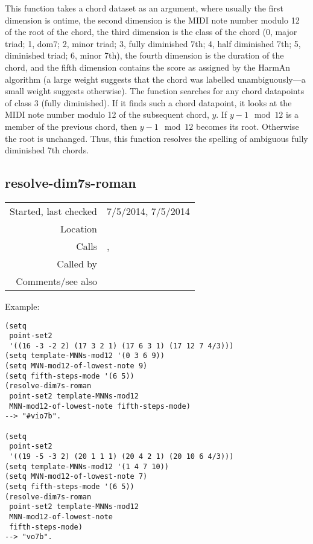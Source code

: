 \noindent This function takes a chord dataset as an
argument, where usually the first dimension is ontime,
the second dimension is the MIDI note number modulo 12
of the root of the chord, the third dimension is the
class of the chord (0, major triad; 1, dom7; 2, minor
triad; 3, fully diminished 7th; 4, half diminished
7th; 5, diminished triad; 6, minor 7th), the fourth
dimension is the duration of the chord, and the
fifth dimension contains the score as assigned by the
HarmAn algorithm (a large weight suggests that the
chord was labelled unambiguously---a small weight
suggests otherwise). The function searches for any
chord datapoints of class 3 (fully diminished). If it
finds such a chord datapoint, it looks at the MIDI
note number modulo 12 of the subsequent chord, $y$. If
$y - 1 \mod 12$ is a member of the previous chord,
then $y - 1 \mod 12$ becomes its root. Otherwise the
root is unchanged. Thus, this function resolves the
spelling of ambiguous fully diminished 7th chords.


\subsection*{resolve-dim7s-roman}\label{fun:resolve-dim7s-roman}

\vspace{0.3cm}
\begin{tabular}{r|p{8cm}}
Started, last checked & 7/5/2014, 7/5/2014 \\
Location & \nameref{sec:chord-labelling} \\
Calls & \nameref{fun:max-argmax}, \nameref{fun:restrict-point-set-to-MNN-mod12} \\
Called by & \nameref{fun:HarmAn->roman} \\
Comments/see also & \nameref{fun:resolve-dim7s}
\end{tabular}

\vspace{0.5cm}
\noindent Example:
\begin{verbatim}
(setq
 point-set2
 '((16 -3 -2 2) (17 3 2 1) (17 6 3 1) (17 12 7 4/3)))
(setq template-MNNs-mod12 '(0 3 6 9))
(setq MNN-mod12-of-lowest-note 9)
(setq fifth-steps-mode '(6 5))
(resolve-dim7s-roman
 point-set2 template-MNNs-mod12
 MNN-mod12-of-lowest-note fifth-steps-mode)
--> "#vio7b".

(setq
 point-set2
 '((19 -5 -3 2) (20 1 1 1) (20 4 2 1) (20 10 6 4/3)))
(setq template-MNNs-mod12 '(1 4 7 10))
(setq MNN-mod12-of-lowest-note 7)
(setq fifth-steps-mode '(6 5))
(resolve-dim7s-roman
 point-set2 template-MNNs-mod12
 MNN-mod12-of-lowest-note
 fifth-steps-mode)
--> "vo7b".
\end{verbatim}

